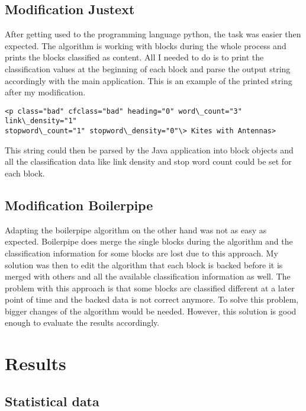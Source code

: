 \subsection{Modification Justext}
\label{subsec:Modification Justext}

After getting used to the programming language python, the task was easier then expected. The algorithm is working with blocks during the whole process and prints the blocks classified as content. All I needed to do is to print the classification values at the beginning of each block and parse the output string accordingly with the main application.
This is an example of the printed string after my modification. \linebreak

\begin{lstlisting}
<p class="bad" cfclass="bad" heading="0" word\_count="3" link\_density="1" 
stopword\_count="1" stopword\_density="0"\> Kites with Antennas>
\end{lstlisting}

This string could then be parsed by the Java application into block objects and all the classification data like link density and stop word count could be set for each block.


\subsection{Modification Boilerpipe}

Adapting the boilerpipe algorithm on the other hand was not as easy as expected. Boilerpipe does merge the single blocks during the algorithm and the classification information for some blocks are lost due to this approach. My solution was then to edit the algorithm that each block is backed before it is merged with others and all the available classification information as well. The problem with this approach is that some blocks are classified different at a later point of time and the backed data is not correct anymore. To solve this problem, bigger changes of the algorithm would be needed. However, this solution is good enough to evaluate the results accordingly.


\section{Results}


\subsection{Statistical data}

